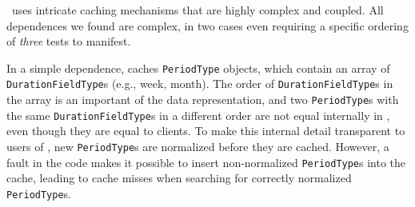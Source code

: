 \newcommand{\periodType}{\texttt{Period\-Type}}
\newcommand{\durationFieldType}{\texttt{Duration\-Field\-Type}}
\newcommand{\forFields}{\texttt{for\-Fields}}


\jodatime\ uses intricate caching mechanisms that are high\-ly complex
and coupled.  All dependences we found are complex,
in two cases even requiring a
specific ordering of \emph{three} tests to manifest.

In a simple dependence, \jodatime{} caches \periodType{} objects, which 
contain an array of
\durationFieldType{}s (e.g., week, month). 
The order of \durationFieldType{}s in the array is an
important of the data representation, and 
two \periodType{}s with the same \durationFieldType{}s in a different
order are not equal internally in \jodatime, even though they are equal
to \jodatime clients.
To make this internal detail transparent to users of \jodatime, 
new \periodType{}s are normalized before they are cached. However, a fault in the code 
makes it possible to insert non-normalized \periodType{}s into the
cache, leading to cache misses when searching for correctly normalized
\periodType{}s.


